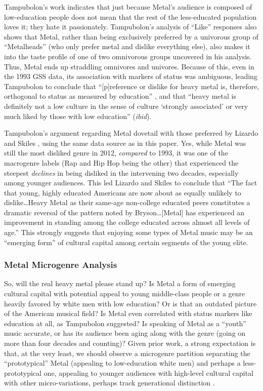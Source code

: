 \documentclass[a4paper,12pt]{extarticle}
\begin{document}
Tampubolon's work indicates that just because Metal's audience is composed of low-education people does not mean that the rest of the less-educated population loves it; they hate it passionately. Tampubolon's analysis of ``Like'' responses also shows that Metal, rather than being exclusively preferred by a univorous group of ``Metalheads'' (who only prefer metal and dislike everything else), also makes it into the taste profile of one of two omnivorous groups uncovered in his analysis. Thus, Metal ends up straddling omnivores and univores. Because of this, even in the 1993 GSS data, its association with markers of status was ambiguous, leading Tampubolon to conclude that ``[p]reference or dislike for heavy metal is, therefore, orthogonal to status as measured by education'' \citeyearpar[][257]{tampubolon2008revisiting}, and that ``heavy metal is definitely not a low culture in the sense of culture `strongly associated' or very much liked by those with low education'' (\textit{ibid}).

Tampubolon's argument regarding Metal dovetail with those preferred by Lizardo and Skiles \citeyearpar{lizardo_skiles15}, using the same data source as in this paper. Yes, while Metal was still the most disliked genre in 2012, \textit{compared} to 1993, it was one of the macrogenre labels (Rap and Hip Hop being the other) that experienced the steepest \textit{declines} in being disliked in the intervening two decades, especially among younger audiences. This led Lizardo and Skiles \citeyearpar[][18]{lizardo_skiles15} to conclude that ``The fact that young, highly educated Americans are now about as equally unlikely to dislike\ldots Heavy Metal as their same-age non-college educated peers constitutes a dramatic reversal of the pattern noted by Bryson\ldots [Metal] has experienced an improvement in standing among the college educated across almost all levels of age.'' This strongly suggests that enjoying some types of Metal music may be an ``emerging form'' of cultural capital \cite{prieur2013emerging} among certain segments of the young elite.  

\subsubsection{Metal Microgenre Analysis}
So, will the real heavy metal please stand up? Is Metal a form of emerging cultural capital with potential appeal to young middle-class people or a genre heavily favored by white men with low education? Or is that an outdated picture of the American musical field? Is Metal even correlated with status markers like education at all, as Tampubolon suggested? Is speaking of Metal as a ``youth'' music accurate, or has its audience been aging along with the genre (going on more than four decades and counting)? Given prior work, a strong expectation is that, at the very least, we should observe a microgenre partition separating the ``prototypical'' Metal (appealing to low-education white men) and perhaps a less-prototypical one, appealing to younger audiences with high-level cultural capital with other micro-variations, perhaps track generational distinction \citep{lizardo_skiles15}.
\end{document}
